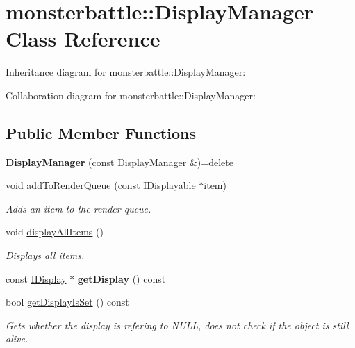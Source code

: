 \hypertarget{classmonsterbattle_1_1DisplayManager}{}\section{monsterbattle\+:\+:Display\+Manager Class Reference}
\label{classmonsterbattle_1_1DisplayManager}


Inheritance diagram for monsterbattle\+:\+:Display\+Manager\+:


Collaboration diagram for monsterbattle\+:\+:Display\+Manager\+:
\subsection*{Public Member Functions}
\begin{DoxyCompactItemize}
\item 
\mbox{\label{classmonsterbattle_1_1DisplayManager_a523cceb27673adf68bdb4a47428fa026}} 
{\bfseries Display\+Manager} (const \hyperlink{classmonsterbattle_1_1DisplayManager}{Display\+Manager} \&)=delete
\item 
void \hyperlink{classmonsterbattle_1_1DisplayManager_a0456f978666a4e9de318d5a2213a3891}{add\+To\+Render\+Queue} (const \hyperlink{structmonsterbattle_1_1IDisplayable}{I\+Displayable} $\ast$item)
\begin{DoxyCompactList}\small\item\em Adds an item to the render queue. \end{DoxyCompactList}\item 
void \hyperlink{classmonsterbattle_1_1DisplayManager_a10b2f43ee54c2fd07fcccafb776dd0b3}{display\+All\+Items} ()
\begin{DoxyCompactList}\small\item\em Displays all items. \end{DoxyCompactList}\item 
\mbox{\label{classmonsterbattle_1_1DisplayManager_a48d80b9a9a6c6109159d6a0af6ef43e6}} 
const \hyperlink{structmonsterbattle_1_1IDisplay}{I\+Display} $\ast$ {\bfseries get\+Display} () const
\item 
bool \hyperlink{classmonsterbattle_1_1DisplayManager_a93348ee551bbaa13a9450d39bcf73dfc}{get\+Display\+Is\+Set} () const
\begin{DoxyCompactList}\small\item\em Gets whether the display is refering to N\+U\+LL, does not check if the object is still alive. \end{DoxyCompactList}\item 

\end{DoxyCompactItemize}
